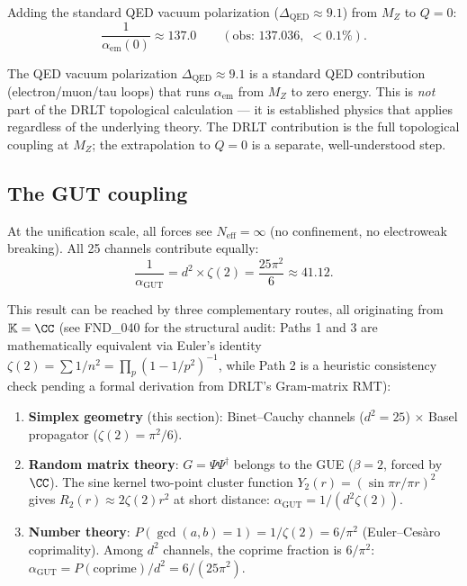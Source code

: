 Adding the standard QED vacuum polarization ($\Delta_\text{QED} \approx 9.1$) from $M_Z$ to $Q = 0$:
\begin{equation}
\frac{1}{\alpha_\text{em}(0)} \approx 137.0 \qquad (\text{obs: } 137.036,\; <0.1\%).
\end{equation}

\begin{remark}
The QED vacuum polarization $\Delta_\text{QED} \approx 9.1$ is a standard QED contribution (electron/muon/tau loops) that runs $\alpha_\text{em}$ from $M_Z$ to zero energy. This is \emph{not} part of the DRLT topological calculation --- it is established physics that applies regardless of the underlying theory. The DRLT contribution is the full topological coupling at $M_Z$; the extrapolation to $Q = 0$ is a separate, well-understood step.
\end{remark}

\subsection{The GUT coupling}

At the unification scale, all forces see $N_\text{eff} = \infty$ (no confinement, no electroweak breaking). All 25 channels contribute equally:
\begin{equation}
\boxed{\frac{1}{\alpha_\text{GUT}} = d^2 \times \zeta(2) = \frac{25\pi^2}{6} \approx 41.12.}
\end{equation}

This result can be reached by three complementary routes, all originating from $\mathbb{K} = \CC$ (see FND\_040 for the structural audit: Paths 1 and 3 are mathematically equivalent via Euler's identity $\zeta(2) = \sum 1/n^2 = \prod_p (1-1/p^2)^{-1}$, while Path 2 is a heuristic consistency check pending a formal derivation from DRLT's Gram-matrix RMT):

\begin{enumerate}
\item \textbf{Simplex geometry} (this section): Binet--Cauchy channels ($d^2 = 25$) $\times$ Basel propagator ($\zeta(2) = \pi^2/6$).

\item \textbf{Random matrix theory}: $G = \Psi\Psi^\dagger$ belongs to the GUE ($\beta = 2$, forced by $\CC$). The sine kernel two-point cluster function $Y_2(r) = (\sin\pi r/\pi r)^2$ gives $R_2(r) \approx 2\zeta(2)r^2$ at short distance: $\alpha_\text{GUT} = 1/(d^2 \zeta(2))$.

\item \textbf{Number theory}: $P(\gcd(a,b) = 1) = 1/\zeta(2) = 6/\pi^2$ (Euler--Ces\`aro coprimality). Among $d^2$ channels, the coprime fraction is $6/\pi^2$: $\alpha_\text{GUT} = P(\text{coprime})/d^2 = 6/(25\pi^2)$.
\end{enumerate}

